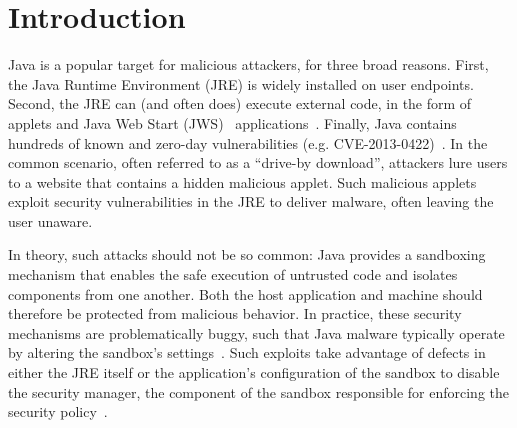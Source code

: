 \documentclass{sig-alternate}
\begin{document}
\section{Introduction}

Java is a popular target for malicious attackers, %
for three broad reasons.  First, the Java Runtime Environment (JRE) is widely installed on user endpoints.
Second, the JRE can (and often does) execute external code, in the form of
applets and Java Web Start (JWS)~\cite{_java_web_start}
applications~\cite{gong1997going,gong2003inside}.  Finally, Java contains
hundreds of known and zero-day vulnerabilities (e.g. CVE-2013-0422)~\cite{xforceQ12013}. In the
common scenario, often referred to as a ``drive-by download'', attackers lure
users to a website that contains a hidden malicious applet. Such malicious
applets exploit security vulnerabilities in the JRE to deliver malware,
often leaving the user unaware.

In theory, such attacks should not be so common: 
Java provides a sandboxing mechanism that enables the safe execution of untrusted code and isolates
components from one another. Both the host application and machine should
therefore be protected from malicious behavior.
In practice, these security mechanisms are problematically
buggy, such that Java malware typically operate by altering the sandbox's
settings~\cite{garber_2012}. Such exploits take advantage of defects in either
the JRE itself or the application's configuration of the sandbox to 
disable the security manager, the component of the sandbox responsible for enforcing the
security policy~\cite{fireeye_2013,svoboda_anatomy_blog_2013,security_explorations_2012,blackhat_2012}.
\end{document}
